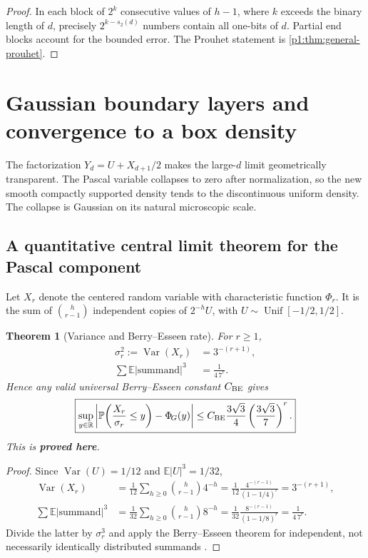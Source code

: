 \documentclass[11pt,oneside]{article}
\numberwithin{equation}{section}
\newtheorem{theorem}{Theorem}[section]
\theoremstyle{definition}
\theoremstyle{remark}
\newcommand{\R}{\mathbb R}
\newcommand{\E}{\mathbb E}
\newcommand{\Prob}{\mathbb P}
\newcommand{\Var}{\operatorname{Var}}
\newcommand{\statusproved}{\textcolor{deepgreen}{\textbf{proved here}}}
\newcommand{\NormalCDF}{\Phi_{\!G}}
\begin{document}
\begin{proof}
In each block of $2^k$ consecutive values of $h-1$, where $k$ exceeds the binary length of
$d$, precisely $2^{k-s_2(d)}$ numbers contain all one-bits of $d$.  Partial end blocks account
for the bounded error.  The Prouhet statement is \cref{p1:thm:general-prouhet}.
\end{proof}


\section{Gaussian boundary layers and convergence to a box density}
\label{p1:sec:boundary}

The factorization $Y_d=U+X_{d+1}/2$ makes the large-$d$ limit geometrically transparent.
The Pascal variable collapses to zero after normalization, so the new smooth compactly
supported density tends to the discontinuous uniform density.  The collapse is Gaussian on
its natural microscopic scale.

\subsection{A quantitative central limit theorem for the Pascal component}

Let $X_r$ denote the centered random variable with characteristic function $\Phi_r$.  It is
the sum of $\binom h{r-1}$ independent copies of $2^{-h}U$, with
$U\sim\operatorname{Unif}[-1/2,1/2]$.

\begin{theorem}[Variance and Berry--Esseen rate]
\label{p1:thm:pascal-BE}
For $r\ge1$,
\begin{align}
 \sigma_r^2:=\Var(X_r)&=3^{-(r+1)},
 \label{p1:eq:pascal-variance}\\
 \sum\E|\text{summand}|^3&=\frac1{4\,7^r}.
 \label{p1:eq:pascal-third-sum}
\end{align}
Hence any valid universal Berry--Esseen constant $C_{\rm BE}$ gives
\begin{equation}
 \boxed{
 \sup_{y\in\R}
 \left|\Prob\!\left(\frac{X_r}{\sigma_r}\le y\right)-\NormalCDF(y)\right|
 \le C_{\rm BE}\frac{3\sqrt3}{4}
       \left(\frac{3\sqrt3}{7}\right)^r.}
 \label{p1:eq:pascal-BE}
\end{equation}
This is \statusproved.
\end{theorem}

\begin{proof}
Since $\Var(U)=1/12$ and $\E|U|^3=1/32$,
\begin{align*}
 \Var(X_r)
 &=\frac1{12}\sum_{h\ge0}\binom h{r-1}4^{-h}
 =\frac1{12}\frac{4^{-(r-1)}}{(1-1/4)^r}
 =3^{-(r+1)},\\
 \sum\E|\text{summand}|^3
 &=\frac1{32}\sum_{h\ge0}\binom h{r-1}8^{-h}
 =\frac1{32}\frac{8^{-(r-1)}}{(1-1/8)^r}
 =\frac1{4\,7^r}.
\end{align*}
Divide the latter by $\sigma_r^3$ and apply the Berry--Esseen theorem for independent,
not necessarily identically distributed summands \cite{p1:petrov1995}.
\end{proof}
\end{document}

